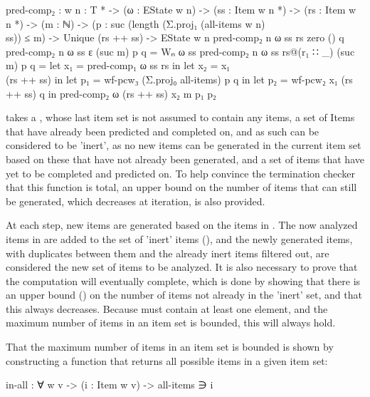 		\begin{code}
			pred-comp₂ : {w n : T *} ->
			  (ω : EState w n) ->
			  (ss : Item w n *) ->
			  (rs : Item w n *) ->
			  (m : ℕ) ->
			  (p : suc (length (Σ.proj₁ (all-items {w} {n}) \\ ss)) ≤ m) ->
			  Unique (rs ++ ss) ->
			  EState w n
			pred-comp₂ {n} ω ss rs zero () q
			pred-comp₂ {n} ω ss ε (suc m) p q = Wₙ ω ss
			pred-comp₂ {n} ω ss rs@(r₁ ∷ _) (suc m) p q =
			  let x₁ = pred-comp₁ ω ss rs in
			  let x₂ = x₁ \\ (rs ++ ss) in
			  let p₁ = wf-pcw₃ (Σ.proj₀ all-items) p q in
			  let p₂ = wf-pcw₂ x₁ (rs ++ ss) q in
			  pred-comp₂ ω (rs ++ ss) x₂ m p₁ p₂
		\end{code}

		 takes a , whose last item set is not
		assumed to contain any items, a set of Items that have already been
		predicted and completed on, and as such can be considered to be
		'inert', as no new items can be generated in the current item set based
		on these that have not already been generated, and a set of items that
		have yet to be completed and predicted on. To help convince the
		termination checker that this function is total, an upper bound on the
		number of items that can still be generated, which decreases at
		iteration, is also provided.

		At each step, new items are generated based on the items in
		. The now analyzed items in  are added to the set
		of 'inert' items (), and the newly generated items, with
		duplicates between them and the already inert items filtered out, are
		considered the new set of items to be analyzed. It is also necessary to
		prove that the computation will eventually complete, which is done by
		showing that there is an upper bound () on the number of
		items not already in the 'inert' set, and that this always decreases.
		Because  must contain at least one element, and the maximum
		number of items in an item set is bounded, this will always hold.

		That the maximum number of items in an item set is bounded is shown by
		constructing a function that returns all possible items in a given item
		set:

		\begin{code}
			in-all : ∀ {w v} -> (i : Item w v) -> all-items ∋ i
		\end{code}

